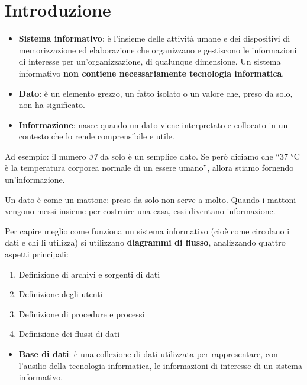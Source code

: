 \section{Introduzione}

\begin{itemize}
    \item \textbf{Sistema informativo}: è l’insieme delle attività umane e dei dispositivi di memorizzazione ed elaborazione che organizzano e gestiscono le informazioni di interesse per un’organizzazione, di qualunque dimensione.  
    Un sistema informativo \textbf{non contiene necessariamente tecnologia informatica}.
    
    \item \textbf{Dato}: è un elemento grezzo, un fatto isolato o un valore che, preso da solo, non ha significato.
    
    \item \textbf{Informazione}: nasce quando un dato viene interpretato e collocato in un contesto che lo rende comprensibile e utile.
\end{itemize}

\noindent
Ad esempio: il numero \emph{37} da solo è un semplice dato. Se però diciamo che “37 °C è la temperatura corporea normale di un essere umano”, allora stiamo fornendo un’informazione.

\begin{tcolorbox}[colback=white,colframe=red!80!black,title=Per capire meglio]
Un dato è come un mattone: preso da solo non serve a molto.  
Quando i mattoni vengono messi insieme per costruire una casa, essi diventano informazione.
\end{tcolorbox}

\noindent
Per capire meglio come funziona un sistema informativo (cioè come circolano i dati e chi li utilizza) si utilizzano \textbf{diagrammi di flusso}, analizzando quattro aspetti principali:
\begin{enumerate}
    \item Definizione di archivi e sorgenti di dati
    \item Definizione degli utenti
    \item Definizione di procedure e processi
    \item Definizione dei flussi di dati
\end{enumerate}

\begin{itemize}
    \item \textbf{Base di dati}: è una collezione di dati utilizzata per rappresentare, con l’ausilio della tecnologia informatica, le informazioni di interesse di un sistema informativo.
\end{itemize}

